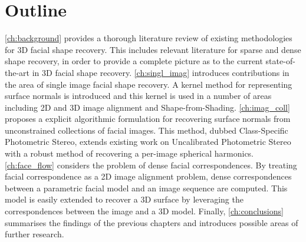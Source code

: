 \section{Outline}\label{sec:introduction_outline}
\cref{ch:background} provides a thorough literature review of existing
methodologies for 3D facial shape recovery. This includes relevant literature
for sparse and dense shape recovery, in order to provide a complete
picture as to the current state-of-the-art in 3D facial shape recovery.
\cref{ch:singl_imag} introduces contributions in the area of single image
facial shape recovery. A kernel method for representing surface normals is 
introduced and this kernel is used in a number of areas including 2D and 3D
image alignment and Shape-from-Shading.
\cref{ch:imag_coll} proposes a explicit algorithmic formulation for recovering
surface normals from unconstrained collections of facial images. This method,
dubbed Class-Specific Photometric Stereo, extends existing work on Uncalibrated
Photometric Stereo~\cite{KemelmacherShlizerman:2013iv,basri2007photometric}
with a robust method of recovering a per-image spherical harmonics.
\cref{ch:face_flow} considers the problem of dense facial correspondences. By
treating facial correspondence as a 2D image alignment problem, dense
correspondences between a parametric facial model and an image sequence are
computed. This model is easily extended to recover a 3D surface by leveraging
the correspondences between the image and a 3D model. 
Finally, \cref{ch:conclusions} summarises the findings of the previous chapters
and introduces possible areas of further research. 
